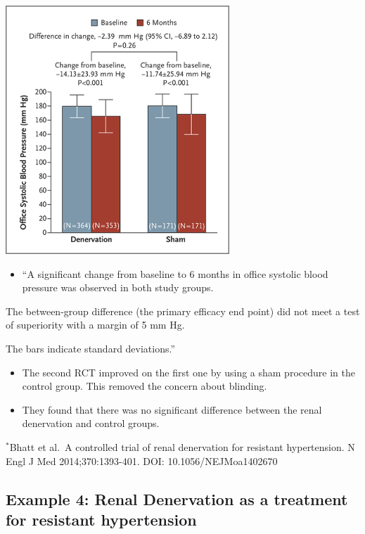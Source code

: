 \documentclass[
]{book}
\providecommand{\tightlist}{%
  \setlength{\itemsep}{0pt}\setlength{\parskip}{0pt}}
\begin{document}
\includegraphics[width=0.5\linewidth]{./1_36}

\begin{itemize}
\tightlist
\item
  ``A significant change from baseline to 6 months in office systolic blood pressure was observed in both study groups.
\end{itemize}

The between-group difference (the primary efficacy end point) did not meet a test of superiority with a margin of 5 mm Hg.

The bars indicate standard deviations.''

\begin{itemize}
\tightlist
\item
  The second RCT improved on the first one by using a sham procedure in the control group. This removed the concern about blinding.
\item
  They found that there was no significant difference between the renal denervation and control groups.
\end{itemize}

\(^*\)Bhatt et al.~A controlled trial of renal denervation for resistant hypertension. N Engl J Med 2014;370:1393-401. DOI: 10.1056/NEJMoa1402670

\hypertarget{example-4-renal-denervation-as-a-treatment-for-resistant-hypertension}{%
\subsection{Example 4: Renal Denervation as a treatment for resistant hypertension}\label{example-4-renal-denervation-as-a-treatment-for-resistant-hypertension}}
\end{document}
